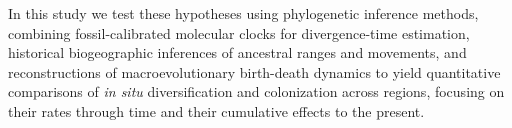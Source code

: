 In this study we test these hypotheses using phylogenetic inference methods, combining fossil-calibrated molecular clocks for divergence-time estimation, historical biogeographic inferences of ancestral ranges and movements, and reconstructions of macroevolutionary birth-death dynamics to yield quantitative comparisons of \textit{in situ} diversification and colonization across regions, focusing on their rates through time and their cumulative effects to the present.








